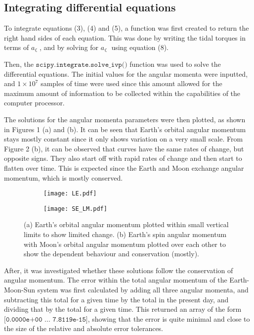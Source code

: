 \documentclass[12pt]{article}
\begin{document}
\subsection{Integrating differential equations}
To integrate equations (3), (4) and (5), a function was first created to return the right hand sides of each equation. This was done by writing the tidal torques in terms of $a_\leftmoon$, and by solving for $a_\leftmoon$ using equation (8). 

Then, the $\texttt{scipy.integrate.solve\_ivp()}$ function was used to solve the differential equations. The initial values for the angular momenta were inputted, and $1 \times 10^{7}$ samples of time were used since this amount allowed for the maximum amount of information to be collected within the capabilities of the computer processor. 

The solutions for the angular momenta parameters were then plotted, as shown in Figures 1 (a) and (b). It can be seen that Earth's orbital angular momentum stays mostly constant since it only shows variation on a very small scale. From Figure 2 (b), it can be observed that curves have the same rates of change, but opposite signs. They also start off with rapid rates of change and then start to flatten over time. This is expected since the Earth and Moon exchange angular momentum, which is mostly conserved.

\begin{figure*}[h]
        \centering
        \begin{subfigure}[b]{0.47\textwidth}
            \centering
            \texttt{[image: LE.pdf]}
            \caption[]%
            {{\small }}    
            \label{fig:mean and std of net14}
        \end{subfigure}
        \begin{subfigure}[b]{0.48\textwidth}   
            \centering 
            \texttt{[image: SE\_LM.pdf]}
            \caption[]%
            {{\small }}    
        \end{subfigure}
        \caption[]%
        {\small (a) Earth's orbital angular momentum plotted within small vertical limits to show limited change. (b) Earth's spin angular momentum with Moon's orbital angular momentum plotted over each other to show the dependent behaviour and conservation (mostly).} 
    \end{figure*}

After, it was investigated whether these solutions follow the conservation of angular momentum. The error within the total angular momentum of the Earth-Moon-Sun system was first calculated by adding all three angular momenta, and subtracting this total for a given time by the total in the present day, and dividing that by the total for a given time. This returned an array of the form $\texttt{[0.0000e+00 ...  7.8119e-15]}$, showing that the error is quite minimal and close to the size of the relative and absolute error tolerances. 
\end{document}
